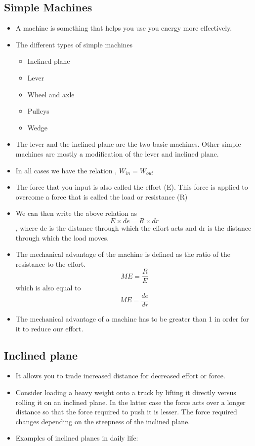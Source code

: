 \documentclass[12pt]{book}
\begin{document}
\subsection*{Simple Machines}
\begin{itemize}
    \item A machine is something that helps you use you energy more effectively.
    \item The different types of simple machines
	\begin{itemize}
	    \item Inclined plane
	    \item Lever
	    \item Wheel and axle
	    \item Pulleys
	    \item Wedge
	\end{itemize}
    \item The lever and the inclined plane are the two basic machines.  Other simple machines are mostly a modification of the lever and inclined plane.
    \item In all cases we have the relation , $ W_{in} = W_{out}$
    \item The force that you input is also called the effort (E). This force is applied to overcome a force that is called the load or resistance (R)
    \item We can then write the above relation as  $$ E\times de = R \times dr$$, where de is the distance through which the effort acts and dr is the distance through which the load moves.
    \item The mechanical advantage of the machine is defined as the ratio of the resistance to the effort.
	$$ ME = \frac{R}{E}$$
	which is also equal to $$ ME = \frac{de}{dr}$$
    \item The mechanical advantage of a machine has to be greater than 1 in order for it to reduce our effort.
\end{itemize}
\subsection*{Inclined plane}
\begin{itemize}
    \item It allows you to trade increased distance for decreased effort or force.
    \item Consider loading a heavy weight onto a truck by lifting it directly versus rolling it on an inclined plane. In the latter case the force acts over a longer distance so that the force required to push it is lesser. The force required changes depending on the steepness of the inclined plane.
    \item Examples of inclined planes in daily life:
\end{itemize}
\end{document}
